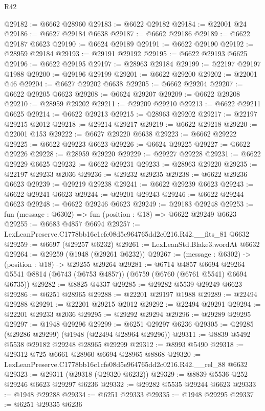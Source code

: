 \begin{lexlean}{R42}
\begin{coremodule}
{@29182 := @6662 @28960
@29183 := @6622 @29182
@29184 := @22001 @24
@29186 := @6627 @29184 @6638
@29187 := @6662 @29186
@29189 := @6622 @29187 @6623
@29190 := @6624 @29189
@29191 := @6622 @29190
@29192 := @28959 @29184
@29193 := @29191 @29192
@29195 := @6622 @29193 @6625
@29196 := @6622 @29195
@29197 := @28963 @29184
@29199 := @22197 @29197 @1988
@29200 := @29196 @29199
@29201 := @6622 @29200
@29202 := @22001 @46
@29204 := @6627 @29202 @6638
@29205 := @6662 @29204
@29207 := @6622 @29205 @6623
@29208 := @6624 @29207
@29209 := @6622 @29208
@29210 := @28959 @29202
@29211 := @29209 @29210
@29213 := @6622 @29211 @6625
@29214 := @6622 @29213
@29215 := @28963 @29202
@29217 := @22197 @29215 @2012
@29218 := @29214 @29217
@29219 := @6622 @29218
@29220 := @22001 @153
@29222 := @6627 @29220 @6638
@29223 := @6662 @29222
@29225 := @6622 @29223 @6623
@29226 := @6624 @29225
@29227 := @6622 @29226
@29228 := @28959 @29220
@29229 := @29227 @29228
@29231 := @6622 @29229 @6625
@29232 := @6622 @29231
@29233 := @28963 @29220
@29235 := @22197 @29233 @2036
@29236 := @29232 @29235
@29238 := @6622 @29236 @6623
@29239 := @29219 @29238
@29241 := @6622 @29239 @6623
@29243 := @6622 @29241 @6623
@29244 := @29201 @29243
@29246 := @6622 @29244 @6623
@29248 := @6622 @29246 @6623
@29249 := @29183 @29248
@29253 := fun (message : @6302) => fun (position : @18) => @6622 @29249 @6623
@29255 := @6683 @4857 @6694
@29257 := LexLeanPreserve.C1778bb16c1cfe08d5e964765dd2c0216.R42.__fits_81 @6632
@29259 := @6697 (@29257 @6232)
@29261 := LexLeanStd.Blake3.wordAt @6632
@29264 := @29259 (@1948 (@29261 @6232))
@29267 := (message : @6302) -> (position : @18) -> @29255 @29264
@29281 := @6714
    @4857
    @6694
    @29264
    @5541
    @8814
    (@6743 (@6753 @4857))
    (@6759 (@6760 (@6761 @5541) @6694 @6735))
@29282 := @8825 @4337
@29285 := @29282 @5539 @29249 @6623
@29286 := @6251 @28965
@29288 := @22201 @29197 @1988
@29289 := @22494 @29288
@29291 := @22201 @29215 @2012
@29292 := @22494 @29291
@29294 := @22201 @29233 @2036
@29295 := @29292 @29294
@29296 := @29289 @29295
@29297 := @1948 @29296
@29299 := @6251 @29297 @6236
@29305 := @29285 (@29286 @29299) (@1948 (@22494 @28964 @29296))
@29311 := @8839 @5492 @5538 @29182 @29248 @28965 @29299
@29312 := @8993 @5490
@29318 := @29312 @725 @6661 @28960 @6694 @28965 @8868
@29320 := LexLeanPreserve.C1778bb16c1cfe08d5e964765dd2c0216.R42.__rel_88 @6632
@29323 := @29311 (@29318 (@29320 @6232))
@29329 := @8839 @5536 @252 @29246 @6623 @29297 @6236
@29332 := @29282 @5535 @29244 @6623
@29333 := @1948 @29288
@29334 := @6251 @29333
@29335 := @1948 @29295
@29337 := @6251 @29335 @6236
}
\end{coremodule}
\end{lexlean}
